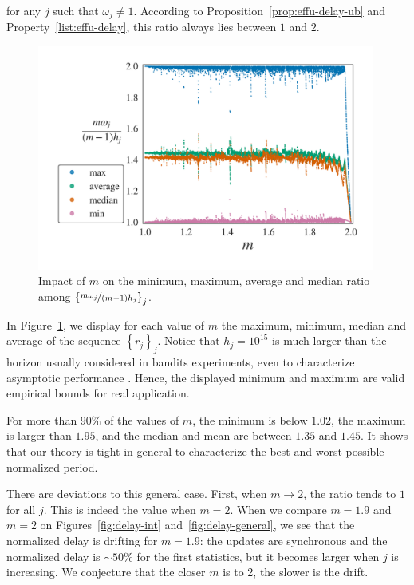 for any $j$ such that $\omega_j\neq 1$. According to Proposition~\ref{prop:effu-delay-ub} and Property~\ref{list:effu-delay}, this ratio always lies between $1$ and $2$.

\begin{figure} 
\centering
\includegraphics[clip, width= 0.99\textwidth]{3Rested/fig/delay_ratio.pdf}
\caption{Impact of $m$ on the minimum, maximum, average and median ratio among $\left\{\nicefrac{m \omega_j}{\left(m-1\right)h_j}\right\}_j$.}
\label{fig:delay-ratio}
\end{figure}

In Figure~\ref{fig:delay-ratio}, we display for each value of $m$ the maximum, minimum, median and average of the sequence $ \left\{ r_j\right\}_j$. Notice that $h_j = 10^{15}$ is much larger than the horizon usually considered in bandits experiments, even to characterize asymptotic performance \citep{chapelle2011empirical, kaufmann2012bayesian, lattimore2018refining}. Hence, the displayed minimum and maximum are valid empirical bounds for real application.

For more than $90\%$ of the values of $m$, the minimum is below $1.02$, the maximum is larger than $1.95$, and the median and mean are between $1.35$ and $1.45$. It shows that our theory is tight in general to characterize the best and worst possible normalized period. 

There are deviations to this general case. First, when $m\rightarrow 2$, the ratio tends to $1$ for all $j$. This is indeed the value when $m=2$. When we compare $m=1.9$ and $m=2$ on Figures~\ref{fig:delay-int} and~\ref{fig:delay-general}, we see that the normalized delay is drifting for $m=1.9$: the updates are synchronous and the normalized delay is $\sim 50 \%$ for the first statistics, but it becomes larger when $j$ is increasing. We conjecture that the closer $m$ is to 2, the slower is the drift.

